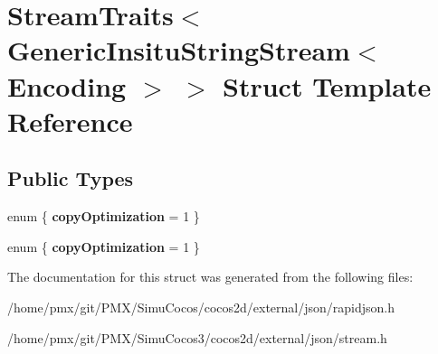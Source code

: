 \hypertarget{structStreamTraits_3_01GenericInsituStringStream_3_01Encoding_01_4_01_4}{}\section{Stream\+Traits$<$ Generic\+Insitu\+String\+Stream$<$ Encoding $>$ $>$ Struct Template Reference}
\label{structStreamTraits_3_01GenericInsituStringStream_3_01Encoding_01_4_01_4}
\subsection*{Public Types}
\begin{DoxyCompactItemize}
\item 
\mbox{\label{structStreamTraits_3_01GenericInsituStringStream_3_01Encoding_01_4_01_4_abfdca0767da2b104d37bd3a9d612178a}} 
enum \{ {\bfseries copy\+Optimization} = 1
 \}
\item 
\mbox{\label{structStreamTraits_3_01GenericInsituStringStream_3_01Encoding_01_4_01_4_ac69b98f6513a73cd142f2c60c0ace0e8}} 
enum \{ {\bfseries copy\+Optimization} = 1
 \}
\end{DoxyCompactItemize}


The documentation for this struct was generated from the following files\+:\begin{DoxyCompactItemize}
\item 
/home/pmx/git/\+P\+M\+X/\+Simu\+Cocos/cocos2d/external/json/rapidjson.\+h\item 
/home/pmx/git/\+P\+M\+X/\+Simu\+Cocos3/cocos2d/external/json/stream.\+h\end{DoxyCompactItemize}
